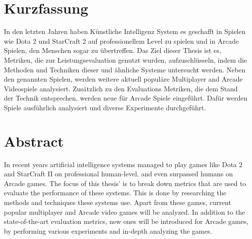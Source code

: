 \chapter{Kurzfassung}
In den letzten Jahren haben K\"unstliche Intelligenz System es geschafft in Spielen wie Dota 2 und StarCraft 2 auf professionellem Level zu spielen und in Arcade Spielen, den Menschen sogar zu \"ubertreffen. Das Ziel dieser Thesis ist es, Metriken, die zur Leistungsevaluation genutzt wurden, aufzuschl\"usseln, indem die Methoden und Techniken dieser und \"ahnliche Systeme untersucht werden. Neben den genannten Spielen, werden weitere aktuell popul\"are Multiplayer and Arcade Videospiele analysiert. Zus\"atzlich zu den Evaluations Metriken, die dem Stand der Technik entsprechen, werden neue f\"ur Arcade Spiele eingef\"uhrt. Daf\"ur werden Spiele ausf\"uhrlich analysiert und diverse Experimente durchgef\"uhrt.

\chapter{Abstract}
In recent years artificial intelligence systems managed to play games like Dota 2 and StarCraft II on professional human-level, and even surpassed humans on Arcade games. The focus of this thesis' is to break down metrics that are used to evaluate the performance of these systems. This is done by researching the methods and techniques these systems use. Apart from these games, current popular multiplayer and Arcade video games will be analyzed. In addition to the state-of-the-art evaluation metrics, new ones will be introduced for Arcade games, by performing various experiments and in-depth analyzing the games.